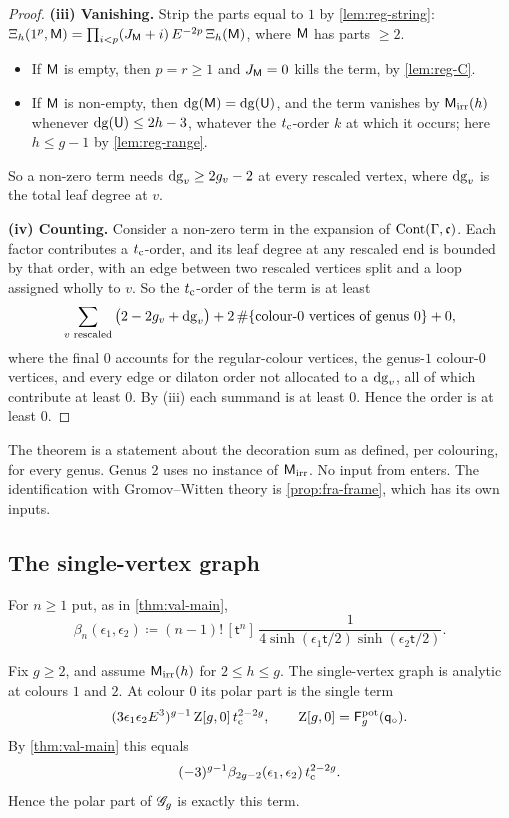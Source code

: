 \begin{proof}
\medskip\noindent\textbf{(iii) Vanishing.} Strip the parts equal to $1$ by \cref{lem:reg-string}: $\Xi_h(1^p,\mathsf{M})=\prod_{i<p}(J_{\mathsf{M}}+i)\,E^{-2p}\,\Xi_h(\mathsf{M})$, where $\mathsf{M}$ has parts $\geq 2$.
\begin{itemize}
\item If $\mathsf{M}$ is empty, then $p=r\geq 1$ and $J_{\mathsf{M}}=0$ kills the term, by \cref{lem:reg-C}.
\item If $\mathsf{M}$ is non-empty, then $\mathrm{dg}(\mathsf{M})=\mathrm{dg}(\mathsf{U})$, and the term vanishes by $\mathsf{M}_{\mathrm{irr}}(h)$ whenever $\mathrm{dg}(\mathsf{U})\leq 2h-3$, whatever the $t_{\mathrm{c}}$-order $k$ at which it occurs; here $h\leq g-1$ by \cref{lem:reg-range}.
\end{itemize}
So a non-zero term needs $\mathrm{dg}_{v}\geq 2g_{v}-2$ at every rescaled vertex, where $\mathrm{dg}_{v}$ is the total leaf degree at $v$.

\medskip\noindent\textbf{(iv) Counting.} Consider a non-zero term in the expansion of $\mathrm{Cont}(\Gamma,\mathfrak{c})$. Each factor contributes a $t_{\mathrm{c}}$-order, and its leaf degree at any rescaled end is bounded by that order, with an edge between two rescaled vertices split and a loop assigned wholly to $v$. So the $t_{\mathrm{c}}$-order of the term is at least
\[
\sum_{v\text{ rescaled}}\big(2-2g_{v}+\mathrm{dg}_{v}\big)+2\,\#\{\text{colour-$0$ vertices of genus $0$}\}+0,
\]
where the final $0$ accounts for the regular-colour vertices, the genus-$1$ colour-$0$ vertices, and every edge or dilaton order not allocated to a $\mathrm{dg}_{v}$, all of which contribute at least $0$. By (iii) each summand is at least $0$. Hence the order is at least $0$.
\end{proof}

The theorem is a statement about the decoration sum as defined, per colouring, for every genus. Genus $2$ uses no instance of $\mathsf{M}_{\mathrm{irr}}$. No input from \cite{BS} enters. The identification with Gromov--Witten theory is \cref{prop:fra-frame}, which has its own inputs.

\subsection{The single-vertex graph}

For $n\geq 1$ put, as in \cref{thm:val-main},
\[
\beta_n(\epsilon_1,\epsilon_2)\coloneqq(n-1)!\,[\mathsf{t}^n]\,\frac{1}{4\sinh(\epsilon_1\mathsf{t}/2)\sinh(\epsilon_2\mathsf{t}/2)}.
\]

\begin{cor}
\label{cor:reg-sv}
Fix $g\geq 2$, and assume $\mathsf{M}_{\mathrm{irr}}(h)$ for $2\leq h\leq g$. The single-vertex graph is analytic at colours $1$ and $2$. At colour $0$ its polar part is the single term
\[
(3\epsilon_1\epsilon_2E^3)^{g-1}\,\mathrm{Z}[g,0]\,t_{\mathrm{c}}^{2-2g},\qquad \mathrm{Z}[g,0]=\mathsf{F}^{\mathrm{pot}}_g(\mathsf{q}_{\circ}).
\]
By \cref{thm:val-main} this equals
\[
(-3)^{g-1}\beta_{2g-2}(\epsilon_1,\epsilon_2)\,t_{\mathrm{c}}^{2-2g}.
\]
Hence the polar part of $\mathscr{G}_g$ is exactly this term.
\end{cor}


